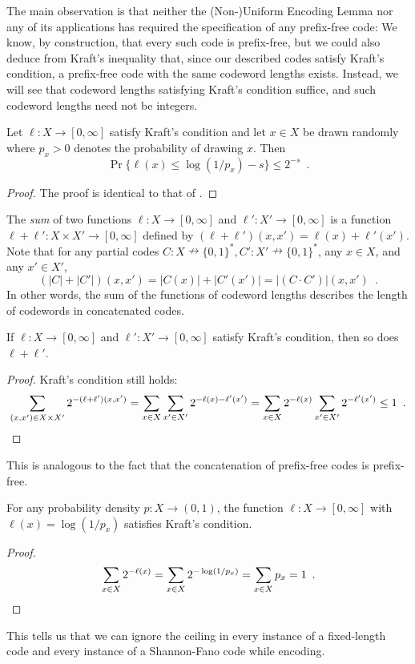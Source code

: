 \documentclass{patmorin}
\begin{document}
The main observation is that neither the (Non-)Uniform Encoding Lemma
nor any of its applications has required the specification of any
prefix-free code: We know, by construction, that every such code is
prefix-free, but we could also deduce from Kraft's inequality that,
since our described codes satisfy Kraft's condition, a prefix-free
code with the same codeword lengths exists. Instead, we will see that
codeword lengths satisfying Kraft's condition suffice, and such
codeword lengths need not be integers.

\begin{lem}
  Let $\ell : X \to [0, \infty]$ satisfy Kraft's condition and let
  $x\in X$ be drawn randomly where $p_x > 0$ denotes the probability
  of drawing $x$.  Then
  \[
    \Pr\{ \ell(x) \le \log(1/p_x)-s\} \le 2^{-s} \enspace .
  \]
\end{lem}
\begin{proof}
  The proof is identical to that of .
\end{proof}

The \emph{sum} of two functions $\ell : X \to [0, \infty]$ and
$\ell' : X' \to [0, \infty]$ is a function
$\ell + \ell' : X \times X' \to [0, \infty]$ defined by
$(\ell + \ell') (x, x') = \ell(x) + \ell'(x')$. Note that for any
partial codes
$C : X \nrightarrow \{0, 1\}^*, C' : X' \nrightarrow \{0, 1\}^*$, any
$x \in X$, and any $x' \in X'$,
\[
(|C| + |C'|)(x, x') = |C(x)| + |C'(x')| = |(C \cdot C')|(x, x') \enspace .
\]
In other words, the sum of the functions of codeword lengths describes
the length of codewords in concatenated codes.

\begin{lem}
  If $\ell : X \to [0, \infty]$ and $\ell' : X' \to [0,
  \infty]$ satisfy Kraft's condition, then so does $\ell + \ell'$.
\end{lem}
\begin{proof}
  Kraft's condition still holds:
  \[
  \sum_{(x, x') \in X \times X'} 2^{-(\ell + \ell')(x, x')} = \sum_{x
    \in X} \sum_{x' \in X'} 2^{-\ell(x) - \ell'(x')} = \sum_{x \in X}
  2^{-\ell(x)} \sum_{x' \in X'} 2^{-\ell'(x')} \leq 1 \enspace
  . \qedhere
  \]
\end{proof}
This is analogous to the fact that the concatenation of prefix-free
codes is prefix-free.

\begin{lem}
  For any probability density $p : X \to (0, 1)$, the function
  $\ell : X \to [0, \infty]$ with $\ell(x) = \log (1/p_x)$ satisfies
  Kraft's condition.
\end{lem}
\begin{proof}
  \[
  \sum_{x \in X} 2^{-\ell(x)} = \sum_{x \in X} 2^{-\log (1/p_x)} =
  \sum_{x \in X} p_x = 1 \enspace . \qedhere
  \]
\end{proof}
This tells us that we can ignore the ceiling in every instance of a
fixed-length code and every instance of a Shannon-Fano code while
encoding.
\end{document}
